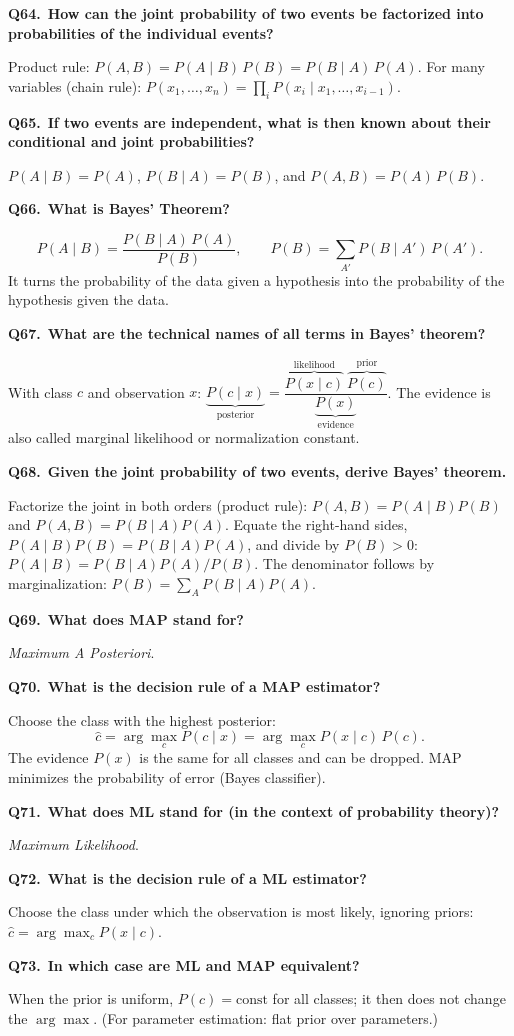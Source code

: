 \documentclass[11pt,a4paper]{article}
\newcommand{\keep}[1]{\par
  \ifdim\dimexpr\pagegoal-\pagetotal\relax<#1\relax\newpage\fi}
\newcommand{\q}[2]{\keep{2.5cm}\medskip
  {\sffamily\bfseries\color{questc}Q#1.}\ {\sffamily\bfseries #2}\par}
\begin{document}
\q{64}{How can the joint probability of two events be factorized into
probabilities of the individual events?}
Product rule: $P(A,B) = P(A\mid B)\,P(B) = P(B\mid A)\,P(A)$. For many
variables (chain rule):
$P(x_1,\dots,x_n) = \prod_i P(x_i\mid x_1,\dots,x_{i-1})$.

\q{65}{If two events are independent, what is then known about their
conditional and joint probabilities?}
$P(A\mid B) = P(A)$, $P(B\mid A)=P(B)$, and $P(A,B) = P(A)\,P(B)$.

\q{66}{What is Bayes' Theorem?}
\[
  P(A\mid B) = \frac{P(B\mid A)\,P(A)}{P(B)}, \qquad
  P(B) = \sum_{A'} P(B\mid A')\,P(A').
\]
\noindent
It turns the probability of the data given a hypothesis into the probability of
the hypothesis given the data.

\q{67}{What are the technical names of all terms in Bayes' theorem?}
With class $c$ and observation $x$:
$\underbrace{P(c\mid x)}_{\text{posterior}} =
\dfrac{\overbrace{P(x\mid c)}^{\text{likelihood}}\ \overbrace{P(c)}^{\text{prior}}}
{\underbrace{P(x)}_{\text{evidence}}}$.
The evidence is also called marginal likelihood or normalization constant.

\q{68}{Given the joint probability of two events, derive Bayes' theorem.}
Factorize the joint in both orders (product rule):
$P(A,B) = P(A\mid B)P(B)$ and $P(A,B)=P(B\mid A)P(A)$. Equate the right-hand
sides, $P(A\mid B)P(B) = P(B\mid A)P(A)$, and divide by $P(B)>0$:
$P(A\mid B) = P(B\mid A)P(A)/P(B)$. The denominator follows by
marginalization: $P(B)=\sum_A P(B\mid A)P(A)$.

\q{69}{What does MAP stand for?}
\emph{Maximum A Posteriori}.

\q{70}{What is the decision rule of a MAP estimator?}
Choose the class with the highest posterior:
\[
  \hat c = \arg\max_c P(c\mid x) = \arg\max_c P(x\mid c)\,P(c).
\]
\noindent
The evidence $P(x)$ is the same for all classes and can be dropped. MAP
minimizes the probability of error (Bayes classifier).

\q{71}{What does ML stand for (in the context of probability theory)?}
\emph{Maximum Likelihood}.

\q{72}{What is the decision rule of a ML estimator?}
Choose the class under which the observation is most likely, ignoring priors:
$\hat c = \arg\max_c P(x\mid c)$.

\q{73}{In which case are ML and MAP equivalent?}
When the prior is uniform, $P(c)=\text{const}$ for all classes; it then does
not change the $\arg\max$. (For parameter estimation: flat prior over
parameters.)
\end{document}
